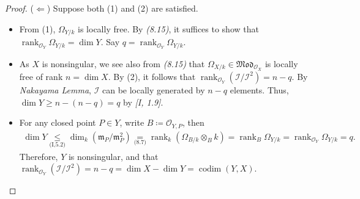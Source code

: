 \documentclass[11pt,a4paper,footinclude=true,headinclude=true]{scrbook} %
\DeclareMathOperator{\rank}{rank}
\DeclareMathOperator{\codim}{codim}
\newcommand{\II}{\mathscr{I}}
\newcommand{\OO}{\mathcal{O}}
\newcommand{\mm}{\mathfrak{m}}
\newcommand{\<}{\langle}
\newcommand{\>}{\rangle}
\newcommand{\MOD}{\mathfrak{Mod}}
\begin{document}
\begin{proof}
    ($\Leftarrow$) Suppose both (1) and (2) are satisfied.
    \begin{itemize}
        \item From (1), $\Omega_{Y/k}$ is locally free. By \textit{(8.15)}, it suffices to show that $\rank_{\OO_Y}\Omega_{Y/k}=\dim Y$. Say $q=\rank_{\OO_Y}\Omega_{Y/k}$.
        \item As $X$ is nonsingular, we see also from \textit{(8.15)} that $\Omega_{X/k}\in\MOD_{\OO_X}$ is locally free of rank $n=\dim X$. By (2), it follows that $\rank_{\OO_Y}(\II/\II^2)=n-q$. By \textit{Nakayama Lemma}, $\II$ can be locally generated by $n-q$ elements. Thus, $\dim Y\geq n-(n-q)=q$ by \textit{[I, 1.9]}.
        \item For any closed point $P\in Y$, write $B\coloneqq\OO_{Y,P}$, then
        \begin{align*}
            \dim Y\underset{\text{(I,5.2)}}{\leq}\dim_k(\mm_P/\mm_P^2)\underset{\text{(8.7)}}{=}\rank_k(\Omega_{B/k}\otimes_Bk)=\rank_B\Omega_{Y/k}=\rank_{\OO_Y}\Omega_{Y/k}=q.
        \end{align*}
        Therefore, $Y$ is nonsingular, and that $\rank_{\OO_Y}(\II/\II^2)=n-q=\dim X-\dim Y=\codim(Y,X)$.
    \end{itemize}
    

\end{proof}
\end{document}

